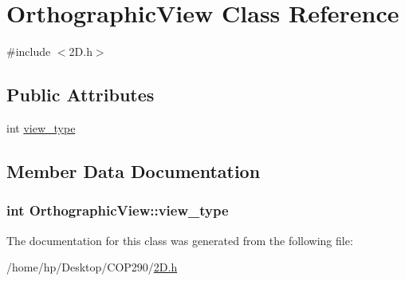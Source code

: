 \hypertarget{class_orthographic_view}{}\section{Orthographic\+View Class Reference}
\label{class_orthographic_view}


{\ttfamily \#include $<$2\+D.\+h$>$}

\subsection*{Public Attributes}
\begin{DoxyCompactItemize}
\item 
int \hyperlink{class_orthographic_view_ae9f5b34d51d46495fd507dfa8f0c352b}{view\+\_\+type}
\end{DoxyCompactItemize}


\subsection{Member Data Documentation}
\subsubsection[{\texorpdfstring{view\+\_\+type}{view_type}}]{\setlength{\rightskip}{0pt plus 5cm}int Orthographic\+View\+::view\+\_\+type}\hypertarget{class_orthographic_view_ae9f5b34d51d46495fd507dfa8f0c352b}{}\label{class_orthographic_view_ae9f5b34d51d46495fd507dfa8f0c352b}


The documentation for this class was generated from the following file\+:\begin{DoxyCompactItemize}
\item 
/home/hp/\+Desktop/\+C\+O\+P290/\hyperlink{2_d_8h}{2\+D.\+h}\end{DoxyCompactItemize}

